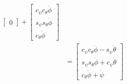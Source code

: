 \documentclass{../homework}
\begin{document}
\begin{parts}[n]
\[\begin{aligned}
\begin{bmatrix}
            0
          \end{bmatrix} + 
          \begin{bmatrix}
            c_{\psi}c_{\theta}\dot{\phi} \\
            s_{\psi}s_{\theta}\dot{\phi} \\
            c_{\theta}\dot{\phi}
          \end{bmatrix} \\
          &=
          \begin{bmatrix}
            c_{\psi}c_{\theta}\dot{\phi} - s_{\psi}\dot{\theta} \\
            s_{\psi}s_{\theta}\dot{\phi} + c_{\psi}\dot{\theta} \\
            c_{\theta}\dot{\phi} + \dot{\psi}
          \end{bmatrix}
       \end{aligned}
     \]
\end{parts}
\end{document}
